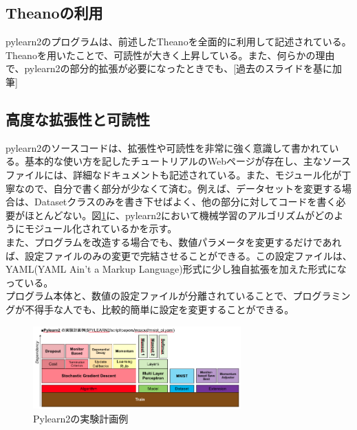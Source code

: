 \subsection{Theanoの利用}
pylearn2のプログラムは、前述したTheanoを全面的に利用して記述されている。Theanoを用いたことで、可読性が大きく上昇している。また、何らかの理由で、pylearn2の部分的拡張が必要になったときでも、[過去のスライドを基に加筆]
\subsection{高度な拡張性と可読性}
pylearn2のソースコードは、拡張性や可読性を非常に強く意識して書かれている。基本的な使い方を記したチュートリアルのWebページが存在し、主なソースファイルには、詳細なドキュメントも記述されている。また、モジュール化が丁寧なので、自分で書く部分が少なくて済む。例えば、データセットを変更する場合は、Datasetクラスのみを書き下せばよく、他の部分に対してコードを書く必要がほとんどない。図\ref{c4_pylearn2_yaml}に、pylearn2において機械学習のアルゴリズムがどのようにモジュール化されているかを示す。\\
また、プログラムを改造する場合でも、数値パラメータを変更するだけであれば、設定ファイルのみの変更で完結させることができる。この設定ファイルは、YAML(YAML Ain't a Markup Language)形式に少し独自拡張を加えた形式になっている。\\
プログラム本体と、数値の設定ファイルが分離されていることで、プログラミングが不得手な人でも、比較的簡単に設定を変更することができる。\\
\begin{figure}[tbp]
 \begin{center}
  \includegraphics[width=80mm]{img/c4/pylearn2_yaml}
 \end{center}
 \caption{Pylearn2の実験計画例}
 \label{c4_pylearn2_yaml}
\end{figure}

